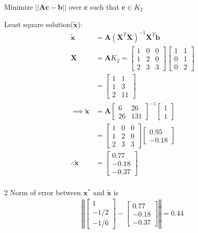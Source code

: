 \documentclass[12pt, letterpaper]{article}
\begin{document}
Minimize $||\mathbf{A}\mathbf{c} - \mathbf{b}||$ over $\mathbf{c}$ such that $\mathbf{c} \in K_2$

Least square solution($\mathbf{\tilde{x}}$):
\begin{align*}
  \mathbf{\tilde{x}} &= \mathbf{A}(\mathbf{X}^T\mathbf{X})^{-1}\mathbf{X}^T\mathbf{b} \\
  \mathbf{X} &= \mathbf{A}K_2 =
  \begin{bmatrix} 1 & 0 & 0 \\ 1 & 2 & 0 \\ 2 & 3 & 3 \end{bmatrix}
  \begin{bmatrix} 1 & 1 \\ 0 & 1 \\ 0 & 2 \end{bmatrix} \\
  &=\begin{bmatrix} 1 & 1 \\ 1 & 3 \\ 2 & 11 \end{bmatrix} \\
  \implies \mathbf{\tilde{x}} &=
  \mathbf{A}\begin{bmatrix} 6 & 26 \\ 26 & 131 \end{bmatrix}^{-1}
  \begin{bmatrix} 1 \\ 1 \end{bmatrix} \\
  &= \begin{bmatrix} 1 & 0 & 0 \\ 1 & 2 & 0 \\ 2 & 3 & 3 \end{bmatrix}
  \begin{bmatrix} 0.95 \\ -0.18 \end{bmatrix} \\
  \therefore \mathbf{\tilde{x}} &= \begin{bmatrix} 0.77 \\ -0.18 \\ -0.37 \end{bmatrix} \\
\end{align*}

2 Norm of error between $\mathbf{x}^{*}$ and $\mathbf{\tilde{x}}$ is
\begin{align*}
  \left\Vert \begin{bmatrix} 1  \\ -1/2  \\ -1/6  \end{bmatrix}
  - \begin{bmatrix} 0.77 \\ -0.18 \\ -0.37 \end{bmatrix}\right\Vert
  = 0.44
\end{align*}
\end{document}
